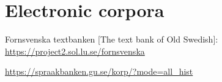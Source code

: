 \documentclass[output=paper,colorlinks,citecolor=brown,draft,draftmode]{langscibook}
\begin{document}
\section*{Electronic corpora}

\begin{description}[font=\normalfont]
\item[FTB:] Fornsvenska textbanken [The text bank of Old Swedish]: \url{https://project2.sol.lu.se/fornsvenska} 
\item[Korp:] \url{https://spraakbanken.gu.se/korp/?mode=all_hist}
\end{description}


{\sloppy\printbibliography[heading=subbibliography,notkeyword=this]}
\end{document}
